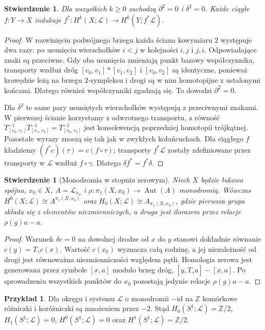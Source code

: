 \documentclass[11pt,a4paper,oneside]{report}
\newcommand{\Z}{\mathbb{Z}}
\newcommand{\id}{\mathrm{id}}
\theoremstyle{plain}
\newtheorem{stwierdzenie}[twierdzenie]{Stwierdzenie}
\theoremstyle{definition}
\newtheorem{przyklad}[twierdzenie]{Przykład}
\theoremstyle{remark}
\begin{document}
\begin{stwierdzenie}
\label{prop:local-delta-v4}
Dla wszystkich $k\ge0$ zachodzą $\partial^2=0$ i
$\delta^2=0$. Każde ciągłe $f:Y\to X$ indukuje
$f^*:H^k(X;\mathcal L)\to H^k(Y;f^*\mathcal L)$.
\end{stwierdzenie}
\begin{proof}
W rozwinięciu podwójnego brzegu każda ściana
kowymiaru $2$ występuje dwa razy: po usunięciu
wierzchołków $i<j$ w kolejności $i,j$ i $j,i$.
Odpowiadające znaki są przeciwne. Gdy oba usunięcia
zmieniają punkt bazowy współczynnika, transporty
wzdłuż dróg $[v_0,v_1]*[v_1,v_2]$ i $[v_0,v_2]$
są identyczne, ponieważ krawędzie leżą na brzegu
$2$-sympleksu i drogi są w nim homotopijne z ustalonymi
końcami. Dlatego również współczynniki zgadzają się.
To dowodzi $\partial^2=0$.

Dla $\delta^2$ te same pary usuniętych wierzchołków
występują z przeciwnymi znakami. W pierwszej ścianie
korzystamy z odwrotnego transportu, a równość
$T_{[v_0,v_1]}^{-1}T_{[v_1,v_2]}^{-1}
=T_{[v_0,v_2]}^{-1}$ jest konsekwencją poprzedniej
homotopii trójkątnej. Pozostałe wyrazy znoszą się tak
jak w zwykłych kołańcuchach. Dla ciągłego $f$
kładziemy $(f^*c)(\tau)=c(f\circ\tau)$;
transporty $f^*\mathcal L$ zostały zdefiniowane
przez transporty w $\mathcal L$ wzdłuż $f\circ\gamma$.
Dlatego $\delta f^*=f^*\delta$.
\end{proof}

\begin{stwierdzenie}[Monodromia w stopniu zerowym]
Niech $X$ będzie łukowo spójna, $x_0\in X$,
$A=\mathcal L_{x_0}$ i
$\rho:\pi_1(X,x_0)\to\operatorname{Aut}(A)$ monodromią.
Wówczas $H^0(X;\mathcal L)\cong A^{\pi_1(X,x_0)}$
oraz $H_0(X;\mathcal L)\cong A_{\pi_1(X,x_0)}$,
gdzie pierwsza grupa składa się z elementów niezmienniczych,
a druga jest ilorazem przez relacje $\rho(g)a-a$.
\end{stwierdzenie}
\begin{proof}
Warunek $\delta c=0$ na dowolnej drodze od $x$ do $y$
stanowi dokładnie równanie $c(y)=T_\gamma c(x)$.
Wartość $c(x_0)$ wyznacza całą rodzinę, a jej
niezależność od drogi jest równoważna niezmienniczości
względem pętli. Homologia zerowa jest generowana przez
symbole $[x,a]$ modulo brzeg dróg,
$[y,T_\gamma a]-[x,a]$. Po sprowadzeniu wszystkich
punktów do $x_0$ pozostają jedynie relacje
$\rho(g)a-a$.
\end{proof}

\begin{przyklad}
Dla okręgu i systemu $\mathcal L$ o monodromii
$-\id$ na $\Z$ komórkowe różniczki i koróżniczki są
mnożeniem przez $-2$. Stąd
$H_0(S^1;\mathcal L)=\Z/2$,
$H_1(S^1;\mathcal L)=0$,
$H^0(S^1;\mathcal L)=0$ oraz
$H^1(S^1;\mathcal L)=\Z/2$.
\end{przyklad}
\end{document}
